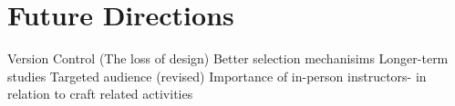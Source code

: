 \chapter{Future Directions}

	
	Version Control (The loss of design)
	Better selection mechanisims
	Longer-term studies
Targeted audience (revised)
Importance of in-person instructors- in relation to craft related activities
